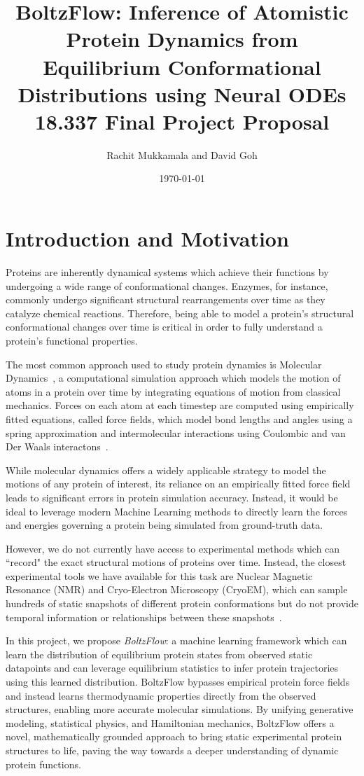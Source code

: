\documentclass[a4paper,11pt]{article}
\title{BoltzFlow: Inference of Atomistic Protein Dynamics from Equilibrium Conformational Distributions using Neural ODEs
        \vspace{0.5cm} \\
        \large 18.337 Final Project Proposal}
\author{Rachit Mukkamala and David Goh}
\date{\today}
\begin{document}
\maketitle

\section{Introduction and Motivation}

Proteins are inherently dynamical systems which achieve their functions by undergoing a wide range of conformational changes. Enzymes, for instance, commonly undergo significant structural rearrangements over time as they catalyze chemical reactions. Therefore, being able to model a protein's structural conformational changes over time is critical in order to fully understand a protein's functional properties.

The most common approach used to study protein dynamics is Molecular Dynamics~\cite{hollingsworth2018}, a computational simulation approach which models the motion of atoms in a protein over time by integrating equations of motion from classical mechanics. Forces on each atom at each timestep are computed using empirically fitted equations, called force fields, which model bond lengths and angles using a spring approximation and intermolecular interactions using Coulombic and van Der Waals interactons~\cite{huang2013,maier2015}. 

While molecular dynamics offers a widely applicable strategy to model the motions of any protein of interest, its reliance on an empirically fitted force field leads to significant errors in protein simulation accuracy. Instead, it would be ideal to leverage modern Machine Learning methods to directly learn the forces and energies governing a protein being simulated from ground-truth data.

However, we do not currently have access to experimental methods which can ``record" the exact structural motions of proteins over time. Instead, the closest experimental tools we have available for this task are Nuclear Magnetic Resonance (NMR) and Cryo-Electron Microscopy (CryoEM), which can sample hundreds of static snapshots of different protein conformations but do not provide temporal information or relationships between these snapshots~\cite{zhong2021}.

In this project, we propose \textit{BoltzFlow}: a machine learning framework which can learn the distribution of equilibrium protein states from observed static datapoints and can leverage equilibrium statistics to infer protein trajectories using this learned distribution. BoltzFlow bypasses empirical protein force fields and instead learns thermodynamic properties directly from the observed structures, enabling more accurate molecular simulations. By unifying generative modeling, statistical physics, and Hamiltonian mechanics, BoltzFlow offers a novel, mathematically grounded approach to bring static experimental protein structures to life, paving the way towards a deeper understanding of dynamic protein functions.
\end{document}
